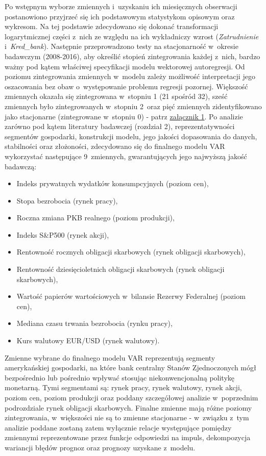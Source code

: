 Po wstępnym wyborze zmiennych i~uzyskaniu ich miesięcznych obserwacji postanowiono przyjrzeć się ich podstawowym statystykom opisowym oraz wykresom. Na tej podstawie zdecydowano się dokonać transformacji logarytmicznej części z~nich ze względu na ich wykładniczy wzrost (\textit{Zatrudnienie} i~\textit{Kred_bank}). Następnie przeprowadzono testy na stacjonarność w~okresie badawczym (2008-2016), aby określić stopień zintegrowania każdej z~nich, bardzo ważny pod kątem właściwej specyfikacji modelu wektorowej autoregresji. Od poziomu zintegrowania zmiennych w~modelu zależy możliwość interpretacji jego oszacowania bez obaw o~występowanie problemu regresji pozornej. Większość zmiennych okazała się zintegrowana w~stopniu 1 (21 spośród 32), sześć zmiennych było zintegrowanych w~stopniu 2~oraz pięć zmiennych zidentyfikowano jako stacjonarne (zintegrowane w~stopniu 0) - patrz \hyperlink{zal1}{załącznik 1}. Po analizie zarówno pod kątem literatury badawczej (rozdział 2), reprezentatywności segmentów gospodarki, konstrukcji modelu, jego jakości dopasowania do danych, stabilności oraz złożoności, zdecydowano się do finalnego modelu VAR wykorzystać następujące 9~zmiennych, gwarantujących jego najwyższą jakość badawczą: 
\begin{itemize}
\setlength\itemsep{0.05cm}
\item Indeks prywatnych wydatków konsumpcyjnych (poziom cen),
\item Stopa bezrobocia (rynek pracy),
\item Roczna zmiana \acs{PKB} realnego (poziom produkcji),
\item Indeks S\&P500 (rynek akcji),
\item Rentowność rocznych obligacji skarbowych (rynek obligacji skarbowych),
\item Rentowność dziesięcioletnich obligacji skarbowych (rynek obligacji skarbowych),
\item Wartość papierów wartościowych w~bilansie Rezerwy Federalnej  (poziom cen),
\item Mediana czasu trwania bezrobocia (rynku pracy),
\item Kurs walutowy EUR/USD (rynek walutowy).
\end{itemize}

\noindent Zmienne wybrane do finalnego modelu \acs{VAR} reprezentują segmenty amerykańskiej gospodarki, na które bank centralny Stanów Zjednoczonych mógł bezpośrednio lub pośrednio wpływać stosując niekonwencjonalną politykę monetarną. Tymi segmentami są: rynek pracy, rynek walutowy, rynek akcji, poziom cen, poziom produkcji oraz poddany szczegółowej analizie w~poprzednim podrozdziale rynek obligacji skarbowych. Finalne zmienne mają różne poziomy zintegrowania, w~większości nie są to zmienne stacjonarne - w~związku z~tym analizie poddane zostaną zatem wyłącznie relacje występujące pomiędzy zmiennymi reprezentowane przez funkcje odpowiedzi na impuls, dekompozycja wariancji błędów prognoz oraz prognozy uzyskane z~modelu.

